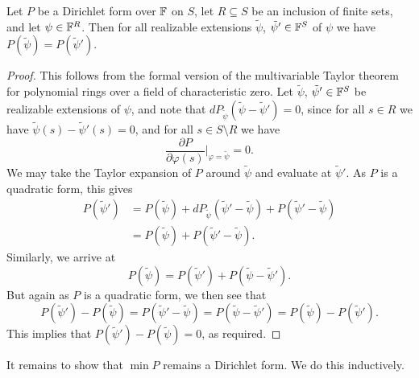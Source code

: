 \begin{lemma} \label{lem:welldefineddirichletmin}
  Let $P$ be a Dirichlet form over ${\mathbb F}$ on $S$, let $R \subseteq S$ be an
  inclusion of finite sets, and let $\psi \in {\mathbb F}^R$. Then for all realizable
  extensions $\tilde\psi$, $\tilde\psi' \in {\mathbb F}^S$ of $\psi$ we have $P(\tilde\psi) =
  P(\tilde\psi')$. 
\end{lemma}
\begin{proof}
  This follows from the formal version of the multivariable Taylor theorem for
  polynomial rings over a field of characteristic zero. Let $\tilde\psi$,
  $\tilde\psi' \in {\mathbb F}^S$ be realizable extensions of $\psi$, and note that
  $dP_{\tilde\psi}(\tilde\psi-\tilde\psi')=0$, since for all $s \in R$ we have
  $\tilde\psi(s) -\tilde\psi'(s) =0$, and for all $s \in S \setminus R$ we have
  \[
    \frac{\partial P}{\partial \varphi(s)}\bigg\vert_{\varphi = \tilde\psi}=0. 
  \]
  We may take the Taylor expansion of $P$ around $\tilde\psi$ and evaluate at
  $\tilde\psi'$. As $P$ is a quadratic form, this gives
  \begin{align*}
    P(\tilde\psi') &=
    P(\tilde\psi)+dP_{\tilde\psi}(\tilde\psi'-\tilde\psi)+P(\tilde\psi'-\tilde\psi)
    \\
    & = P(\tilde\psi)+P(\tilde\psi'-\tilde\psi).
  \end{align*}
  Similarly, we arrive at  
  \[
    P(\tilde\psi)= P(\tilde\psi')+P(\tilde\psi-\tilde\psi').
  \]
  But again as $P$ is a quadratic form, we then see that 
  \[
    P(\tilde\psi')-P(\tilde\psi) = P(\tilde\psi'-\tilde\psi) =
    P(\tilde\psi-\tilde\psi') = P(\tilde\psi)-P(\tilde\psi').
  \]
  This implies that $P(\tilde\psi')-P(\tilde\psi) = 0$, as required.
\end{proof}

It remains to show that $\min P$ remains a Dirichlet form. We do this
inductively.

